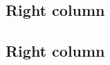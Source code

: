 \documentclass[a4paper, 11pt]{article}
\begin{document}
\begin{poster}
\begin{postercolumns}[3]
        \posternextcolumn
        \posternextcolumn

        \begin{posterblock}
            \section{Right column}
        \end{posterblock}
        \begin{posterblock}
            \section{Right column}
        \end{posterblock}

    \end{postercolumns}

    \begin{logobar}[logobar]
        \centering
        \hfill
        \hfill
        \hfill
    \end{logobar}

\end{poster}
\end{document}

